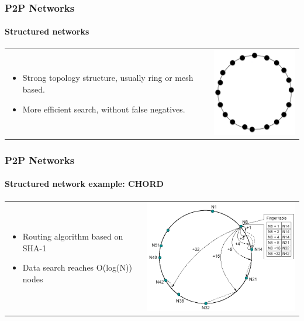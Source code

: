 \documentclass[12pt]{beamer}
\begin{document}
  \begin{frame}
  \frametitle{P2P Networks}
  \framesubtitle{Structured networks}
  \begin{table}
  \begin{tabular}{p{7cm}p{3cm}}
  \begin{itemize}
      \item Strong topology structure, usually ring or mesh based.
      \item More efficient search, without false negatives.
  \end{itemize}
  &
  \vspace{1.5cm}
  \includegraphics[width=4cm]{../../presentacion/img/p2p-structured}\\
  \end{tabular}
  \end{table}
  \end{frame}

  \begin{frame}
  \frametitle{P2P Networks}
  \framesubtitle{Structured network example: CHORD}
  \begin{table}
  \begin{tabular}{p{3cm}p{7cm}}
  \begin{itemize}
      \item Routing algorithm based on SHA-1
      \item Data search reaches O(log(N)) nodes
  \end{itemize}
  &
  \vspace{0.5cm}
  \includegraphics[width=8cm]{../../presentacion/img/chord-search}\\
  \end{tabular}
  \end{table}
  \end{frame}
  
\end{document}
